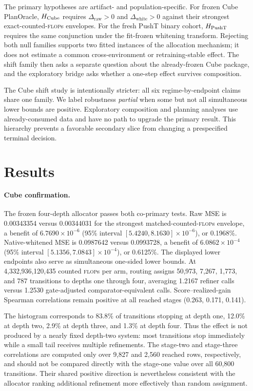 \documentclass{article}
\newcommand{\flops}{\textsc{flop}s}
\newcommand{\raw}{\mathrm{raw}}
\newcommand{\white}{\mathrm{white}}
\newcommand{\benefit}{\Delta}
\begin{document}
The primary hypotheses are artifact- and population-specific. For frozen Cube PlanOracle, \(H_{\rm Cube}\) requires \(\benefit_{\raw}>0\) and \(\benefit_{\white}>0\) against their strongest exact-counted-\flops{} envelopes. For the fresh PushT binary cohort, \(H_{\rm PushT}\) requires the same conjunction under the fit-frozen whitening transform. Rejecting both null families supports two fitted instances of the allocation mechanism; it does not estimate a common cross-environment or retraining-stable effect. The shift family then asks a separate question about the already-frozen Cube package, and the exploratory bridge asks whether a one-step effect survives composition.

The Cube shift study is intentionally stricter: all six regime-by-endpoint claims share one family. We label robustness \emph{partial} when some but not all simultaneous lower bounds are positive. Exploratory composition and planning analyses use already-consumed data and have no path to upgrade the primary result. This hierarchy prevents a favorable secondary slice from changing a prespecified terminal decision.

\section{Results}

\paragraph{Cube confirmation.}
The frozen four-depth allocator passes both co-primary tests. Raw MSE is 0.00343354 versus 0.00344031 for the strongest matched-counted-\flops{} envelope, a benefit of \(6.7690\times10^{-6}\) (95\% interval \([5.4240,8.1630]\times10^{-6}\)), or 0.1968\%. Native-whitened MSE is 0.0987642 versus 0.0993728, a benefit of \(6.0862\times10^{-4}\) (95\% interval \([5.1356,7.0843]\times10^{-4}\)), or 0.6125\%. The displayed lower endpoints also serve as simultaneous one-sided lower bounds. At 4,332,936,120,435 counted \flops{} per arm, routing assigns 50,973, 7,267, 1,773, and 787 transitions to depths one through four, averaging 1.2167 refiner calls versus 1.2530 gate-adjusted comparator-equivalent calls. Score--realized-gain Spearman correlations remain positive at all reached stages (0.263, 0.171, 0.141).

The histogram corresponds to 83.8\% of transitions stopping at depth one, 12.0\% at depth two, 2.9\% at depth three, and 1.3\% at depth four. Thus the effect is not produced by a nearly fixed depth-two system: most transitions stop immediately while a small tail receives multiple refinements. The stage-two and stage-three correlations are computed only over 9,827 and 2,560 reached rows, respectively, and should not be compared directly with the stage-one value over all 60,800 transitions. Their shared positive direction is nevertheless consistent with the allocator ranking additional refinement more effectively than random assignment.
\end{document}
